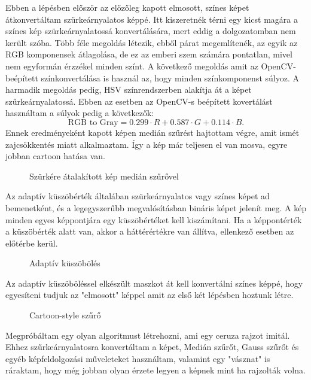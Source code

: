 Ebben a lépésben először az előzőleg kapott elmosott, színes képet átkonvertáltam szürkeárnyalatos képpé. 
Itt kiszeretnék térni egy kicst magára a színes kép szürkeárnyalatossá konvertálására, mert eddig a dolgozatomban nem került szóba. Több féle megoldás létezik, ebből párat megemlítenék, az egyik az RGB komponensek átlagolása, de ez az emberi szem számára pontatlan, mivel nem egyformán érzzékel minden színt. A következő megoldás amit az OpenCV- beépített színkonvertálása is használ az, hogy minden színkomponenst súlyoz. A harmadik megoldás pedig, HSV színrendszerben alakítja át a képet szűrkeárnyalatossá. Ebben az esetben az OpenCV-s beépített kovertálást használtam a súlyok pedig a következők: 
$$\text{RGB to Gray} = 0.299\cdot R+0.587\cdot G+0.114\cdot B.$$ 
Ennek eredményeként kapott képen medián szűrést hajtottam végre, amit ismét zajcsökkentés miatt alkalmaztam. Így a kép már teljesen el van mosva, egyre jobban cartoon hatása van.
\begin{figure}[ht]
\centering
{}
\caption{Szürkére átalakított kép medián szűrővel } 
\label{fig: cartoon3}
\end{figure}
\newpage
{}
Az adaptív küszöbérték általában szürkeárnyalatos vagy színes képet ad bemenetként, és a legegyszerűbb megvalósításban bináris képet jelenít meg. A kép minden egyes képpontjára egy küszöbértéket kell kiszámítani. Ha a képpontérték a küszöbérték alatt van, akkor a háttérértékre van állítva, ellenkező esetben az előtérbe kerül.
\begin{figure}[ht]
\centering
{}
\caption{Adaptív küszöbölés  } 
\label{fig: cartoon4}
\end{figure}
Az adaptív küszöböléssel elkészült maszkot át kell konvertálni színes képpé, hogy egyesíteni tudjuk az "elmosott" képpel amit az első két lépésben hoztunk létre.
\begin{figure}[ht]
\centering
{}
\caption{Cartoon-style szűrő } 
\label{fig: cartoon5}
\end{figure}
Megpróbáltam egy olyan algoritmust létrehozni, ami egy ceruza rajzot imitál. Ehhez szűrkeárnyalatosra konvertáltam a képet, Medián szűrőt, Gauss szűrőt és egyéb képfeldolgozási műveleteket használtam, valamint egy "vásznat" is ráraktam, hogy még jobban olyan érzete legyen a képnek mint ha rajzolták volna.
